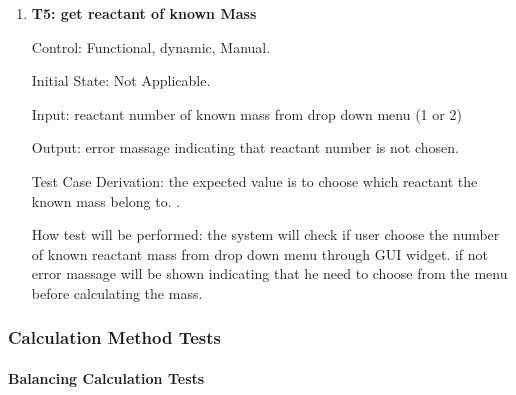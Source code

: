 \documentclass[12pt, titlepage]{article}
\begin{document}
\begin{enumerate}
\item{\bf T5: get reactant of known Mass  \\}

Control: Functional, dynamic, Manual.
					
Initial State: Not Applicable.
					
Input: reactant number of known mass from drop down menu (1 or 2) 

Output: error massage indicating that reactant number is not chosen.

Test Case Derivation: the expected value is to choose which reactant the known mass belong to. . 
					
How test will be performed: 
the system will check if user choose the number of known reactant mass from drop down menu through GUI widget. if not error massage will be shown indicating that he need to choose from the menu before calculating the mass. 

\end{enumerate}

\subsubsection{Calculation Method Tests}

\paragraph{Balancing Calculation Tests}
\end{document}
